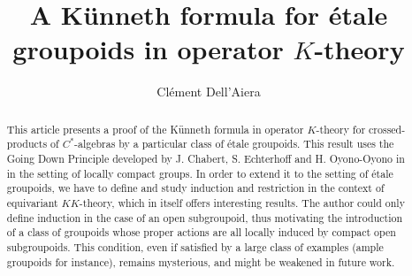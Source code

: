 \documentclass[a4paper,10pt]{article}
\title{A Künneth formula for étale groupoids in operator $K$-theory}
\date{}
\author{Clément Dell'Aiera}
\begin{document}
\maketitle
\tableofcontents

\begin{abstract}
This article presents a proof of the Künneth formula in operator $K$-theory for crossed-products of $C^*$-algebras by a particular class of \'etale groupoids. This result uses the Going Down Principle developed by J. Chabert, S. Echterhoff and H. Oyono-Oyono in \cite{ChabertEOY} in the setting of locally compact groups. In order to extend it to the setting of \'etale groupoids, we have to define and study induction and restriction in the context of equivariant $KK$-theory, which in itself offers interesting results. The author could only define induction in the case of an open subgroupoid, thus motivating the introduction of a class of groupoids whose proper actions are all locally induced by compact open subgroupoids. This condition, even if satisfied by a large class of examples (ample groupoids for instance), remains mysterious, and might be weakened in future work. 
\end{abstract}






 
\end{document}
